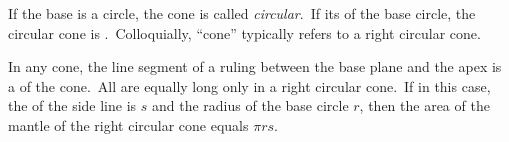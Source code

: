 \documentclass[12pt]{article}
\theoremstyle{definition}
\begin{document}
If the base is a circle, the cone is called {\em circular}.\, If its  of the base circle, the circular cone is .\, Colloquially, ``cone'' typically refers to a right circular cone. 

In any cone, the line segment of a ruling between the base plane and the apex is a  of the cone.\, All  are equally long only in a right circular cone.\, If in this case, the  of the side line is $s$ and the radius of the base circle $r$, then the area of the mantle of the right circular cone equals $\pi{rs}$.
\end{document}
